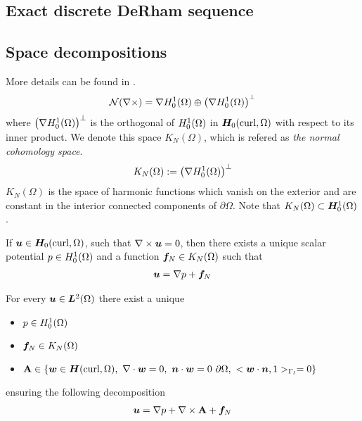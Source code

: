 \subsection{Exact discrete DeRham sequence}




\subsection{Space decompositions}
%
More details can be found in \cite{monk_book, girault1986a}.
%
\begin{align}
	\mathcal{N}(\nabla \times) = \nabla H^1_0(\Omega) \oplus \left( \nabla H^1_0(\Omega) \right)^{\perp} 
\end{align}
where $ \left( \nabla H^1_0(\Omega) \right)^{\perp}$ is the orthogonal of $H^1_0(\Omega)$ in $\bm{H}_0(\mbox{curl}, \Omega)$ with respect to its inner product. We denote this space $K_N(\Omega)$, which is refered as \textit{the normal cohomology space}.  
\begin{align}
	K_N(\Omega) := \left( \nabla H^1_0(\Omega) \right)^{\perp} 
\end{align}
$K_N(\Omega)$ is the space of harmonic functions which vanish on the exterior and are constant in the interior connected components of $\partial\Omega$. Note that $K_N(\Omega) \subset \bm{H}^1_0(\Omega)$.
%
\begin{theorem}
	If $\bm{u} \in \bm{H}_0(\mbox{curl}, \Omega)$, such that $\nabla \times \bm{u} = 0$, then there exists a unique scalar potential $p \in H^1_0(\Omega)$ and a function $\bm{f}_N \in K_N(\Omega)$ such that
	\begin{align}
		\bm{u} = \nabla p + \bm{f}_N
	\end{align}
\end{theorem}
%
\begin{theorem}
	For every $\bm{u} \in \bm{L}^2(\Omega)$ there exist a unique
	\begin{itemize}
		\item $p \in H^1_0(\Omega)$ 
		\item $\bm{f}_N \in K_N(\Omega)$ 
		\item $\mathbf{A} \in \{ \bm{w} \in \bm{H}(\mbox{curl}, \Omega), ~ \nabla \cdot \bm{w} = 0, ~ \bm{n} \cdot \bm{w} = 0 ~ \partial\Omega, ~ < \bm{w} \cdot \bm{n}, 1 >_{\Gamma_l} = 0  \}$ 
	\end{itemize}
	ensuring the following decomposition
	\begin{align}
		\bm{u} = \nabla p + \nabla \times \mathbf{A} + \bm{f}_N 
	\end{align}
\end{theorem}
